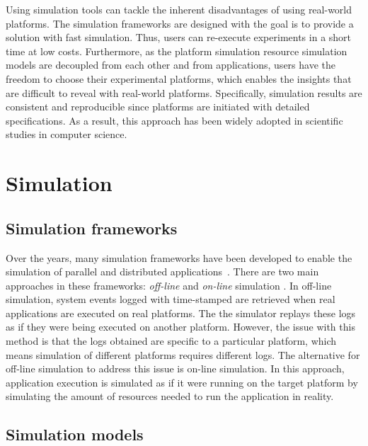 Using simulation tools can tackle the inherent disadvantages of using 
real-world platforms. 
The simulation frameworks are designed with the goal is to provide 
a solution with fast simulation. 
Thus, users can re-execute experiments in a short time at low costs.
Furthermore, as the platform simulation resource simulation models 
are decoupled from each other and from applications, users have 
the freedom to choose their experimental platforms, which enables the 
insights that are difficult to reveal with real-world platforms. 
Specifically, simulation results are consistent and reproducible since 
platforms are initiated with detailed specifications. 
As a result, this approach has been widely adopted in scientific studies
in computer science. 

\section{Simulation}

\subsection{Simulation frameworks}

Over the years, many simulation frameworks have been developed to enable 
the simulation of parallel and distributed 
applications~\cite{optorsim, gridsim, groudsim, cloudsim,
nunez2012simcan,nunez2012icancloud, mdcsim, dissect_cf,
cloudnetsimplusplus, fognetsimplusplus, casanova2014simgrid,
ROSS, casanova2020fgcs}. 
There are two main approaches in these frameworks: \textit{off-line} and 
\textit{on-line} simulation \cite{casanova2014simgrid}. 
In off-line simulation, system events logged with time-stamped are retrieved 
when real applications are executed on real platforms.
The the simulator replays these logs as if they were being executed 
on another platform. 
However, the issue with this method is that the logs obtained are specific to 
a particular platform, which means simulation of different platforms 
requires different logs.
The alternative for off-line simulation to address this issue is 
on-line simulation.
In this approach, application execution is simulated as if it were running 
on the target platform by simulating the amount of resources needed 
to run the application in reality. 

\subsection{Simulation models}

